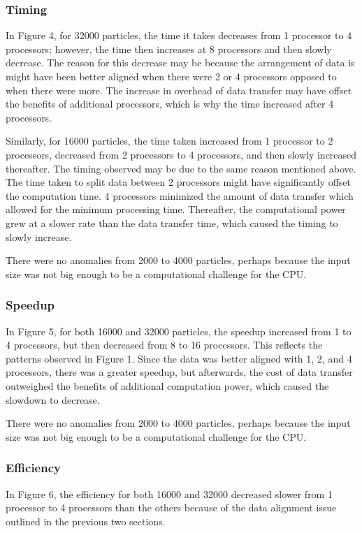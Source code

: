 \documentclass{article}
\begin{document}
\subsubsection{Timing}
In Figure 4, for 32000 particles, the time it takes decreases from 1 processor to 4 processors; however, the time then increases at 8 processors and then slowly decrease. The reason for this decrease may be because the arrangement of data is might have been better aligned when there were 2 or 4 processors opposed to when there were more. The increase in overhead of data transfer may have offset the benefits of additional processors, which is why the time increased after 4 processors.

Similarly, for 16000 particles, the time taken increased from 1 processor to 2 processors, decreased from 2 processors to 4 processors, and then slowly increased thereafter. The timing observed may be due to the same reason mentioned above. The time taken to split data between 2 processors might have significantly offset the computation time. 4 processors minimized the amount of data transfer which allowed for the minimum processing time. Thereafter, the computational power grew at a slower rate than the data transfer time, which caused the timing to slowly increase.

There were no anomalies from 2000 to 4000 particles, perhaps because the input size was not big enough to be a computational challenge for the CPU.
\subsubsection{Speedup}
In Figure 5, for both 16000 and 32000 particles, the speedup increased from 1 to 4 processors, but then decreased from 8 to 16 processors. This reflects the patterns observed in Figure 1. Since the data was better aligned with 1, 2, and 4 processors, there was a greater speedup, but afterwards, the cost of data transfer outweighed the benefits of additional computation power, which caused the slowdown to decrease.

There were no anomalies from 2000 to 4000 particles, perhaps because the input size was not big enough to be a computational challenge for the CPU.

\subsubsection{Efficiency}
In Figure 6, the efficiency for both 16000 and 32000 decreased slower from 1 processor to 4 processors than the others because of the data alignment issue outlined in the previous two sections. 
\end{document}
